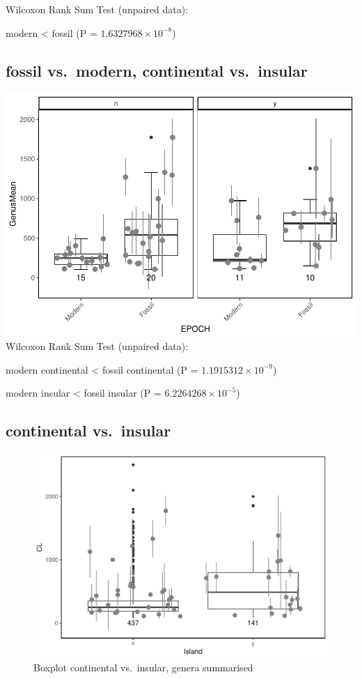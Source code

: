 \documentclass[]{article}
\begin{document}
Wilcoxon Rank Sum Test (unpaired data):

modern \textless{} fossil (P = \(1.6327968\times 10^{-8}\))

\newpage

\subsection{fossil vs.~modern, continental
vs.~insular}\label{fossil-vs.modern-continental-vs.insular}

\includegraphics{MA_JJ_files/figure-latex/Boxplots fossil vs. modern, continental vs. insular-1.pdf}
Wilcoxon Rank Sum Test (unpaired data):

modern continental \textless{} fossil continental (P =
\(1.1915312\times 10^{-9}\))

modern insular \textless{} fossil insular (P =
\(6.2264268\times 10^{-5}\))

\newpage

\subsection{continental vs.~insular}\label{continental-vs.insular-1}

\begin{figure}[htbp]
\centering
\includegraphics{MA_JJ_files/figure-latex/Boxplot continental vs. insular-1.pdf}
\caption{Boxplot continental vs.~insular, genera summarised}
\end{figure}
\end{document}
